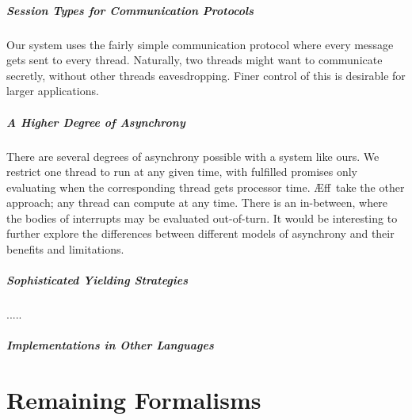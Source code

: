 \documentclass[msc,deptreport,cs]{infthesis} %
\newcommand\aeff{{\AE}ff\xspace}
\begin{document}
\paragraph*{Session Types for Communication Protocols}
Our system uses the fairly simple communication protocol where every message
gets sent to every thread. Naturally, two threads might want to communicate
secretly, without other threads eavesdropping. Finer control of this is
desirable for larger applications.

\paragraph*{A Higher Degree of Asynchrony}
There are several degrees of asynchrony possible with a system like ours. We
restrict one thread to run at any given time, with fulfilled promises only
evaluating when the corresponding thread gets processor time. \aeff~take the
other approach; any thread can compute at any time. There is an in-between,
where the bodies of interrupts may be evaluated out-of-turn. It would be
interesting to further explore the differences between different models of
asynchrony and their benefits and limitations.

\paragraph*{Sophisticated Yielding Strategies}
.....

\paragraph*{Implementations in Other Languages}








\appendix

\chapter{Remaining Formalisms}
\end{document}
